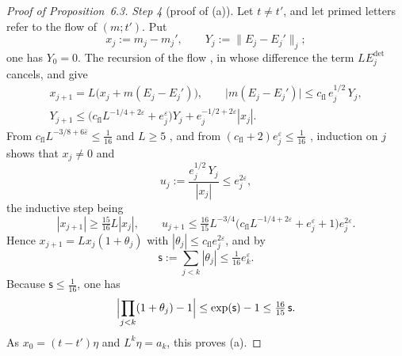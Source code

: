 \documentclass[11pt]{amsart}
\theoremstyle{definition}
\begin{document}
\begin{proof}[Proof of Proposition~6.3]
\emph{Step 4} (proof of (a)).
Let $t\ne t'$, and let primed letters refer to the flow of $(m;t')$.
Put
\begin{equation*}
x_j:=m_j-m_j',\qquad Y_j:=\|E_j-E_j'\|_j ;
\end{equation*}
one has $Y_0=0$.
The recursion of the flow \cite[Section~I.5.7, paragraph ``Flows'']{QEDIII}, in whose difference the term $LE^{\det}_j$ cancels, and \cite[Propositions~48.2\,(a), (b), 48.5\,(a), (b), 24.1\,(e)]{QEDIII} give
\begin{gather*}
x_{j+1}=L\bigl(x_j+m(E_j-E_j')\bigr),\qquad\bigl|m(E_j-E_j')\bigr|\le c_{\mathrm{fl}}\,e_j^{1/2}\,Y_j,\\
Y_{j+1}\le\bigl(c_{\mathrm{fl}}L^{-1/4+2\varepsilon}+e_j^{\varepsilon}\bigr)Y_j+e_j^{-1/2+2\varepsilon}|x_j| .
\end{gather*}
From $c_{\mathrm{fl}}L^{-3/8+6\bar\varepsilon}\le\frac1{16}$ and $L\ge5$ \cite[Proposition~14.2\,(b), rows (L2), (L5)]{QEDIII}, and from $(c_{\mathrm{fl}}+2)e_j^{\varepsilon}\le\frac1{16}$ \cite[(fl)]{QEDIII}, induction on $j$ shows that $x_j\ne0$ and
\begin{equation*}
u_j:=\frac{e_j^{1/2}\,Y_j}{|x_j|}\le e_j^{2\varepsilon},
\end{equation*}
the inductive step being
\begin{equation*}
|x_{j+1}|\ge\tfrac{15}{16}L|x_j|,\qquad u_{j+1}\le\tfrac{16}{15}L^{-3/4}\bigl(c_{\mathrm{fl}}L^{-1/4+2\varepsilon}+e_j^{\varepsilon}+1\bigr)e_j^{2\varepsilon}.
\end{equation*}
Hence $x_{j+1}=Lx_j(1+\theta_j)$ with $|\theta_j|\le c_{\mathrm{fl}}e_j^{2\varepsilon}$, and by \cite[(fl)]{QEDIII}
\begin{equation*}
\mathsf s:=\sum_{j<k}|\theta_j|\le\tfrac1{16}e_k^{\varepsilon}.
\end{equation*}
Because $\mathsf s\le\frac1{16}$, one has
\begin{equation*}
\Bigl|\prod_{j<k}(1+\theta_j)-1\Bigr|\le\exp(\mathsf s)-1\le\tfrac{16}{15}\,\mathsf s .
\end{equation*}
As $x_0=(t-t')\eta$ and $L^k\eta=a_k$, this proves (a).


\end{proof}
\end{document}
